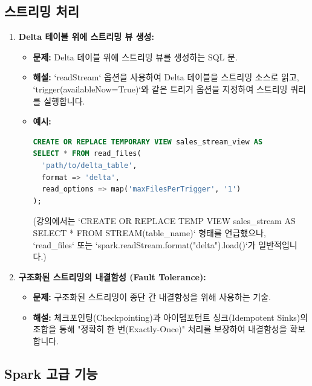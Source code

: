 \documentclass[11pt,a4paper]{article}
\begin{document}
\subsection{스트리밍 처리}

\begin{enumerate}
    \item \textbf{Delta 테이블 위에 스트리밍 뷰 생성:}
    \begin{itemize}
        \item \textbf{문제:} Delta 테이블 위에 스트리밍 뷰를 생성하는 SQL 문.
        \item \textbf{해설:} `readStream` 옵션을 사용하여 Delta 테이블을 스트리밍 소스로 읽고, `trigger(availableNow=True)`와 같은 트리거 옵션을 지정하여 스트리밍 쿼리를 실행합니다.
        \item \textbf{예시:}
        \begin{lstlisting}[language=SQL, caption=스트리밍 뷰 생성 예시]
CREATE OR REPLACE TEMPORARY VIEW sales_stream_view AS
SELECT * FROM read_files(
  'path/to/delta_table',
  format => 'delta',
  read_options => map('maxFilesPerTrigger', '1')
);
        \end{lstlisting}
        (강의에서는 `CREATE OR REPLACE TEMP VIEW sales_stream AS SELECT * FROM STREAM(table_name)` 형태를 언급했으나, `read_files` 또는 `spark.readStream.format("delta").load()`가 일반적입니다.)
    \end{itemize}

    \item \textbf{구조화된 스트리밍의 내결함성 (Fault Tolerance):}
    \begin{itemize}
        \item \textbf{문제:} 구조화된 스트리밍이 종단 간 내결함성을 위해 사용하는 기술.
        \item \textbf{해설:} 체크포인팅(Checkpointing)과 아이뎀포턴트 싱크(Idempotent Sinks)의 조합을 통해 "정확히 한 번(Exactly-Once)" 처리를 보장하여 내결함성을 확보합니다.
    \end{itemize}
\end{enumerate}

\subsection{Spark 고급 기능}
\end{document}

